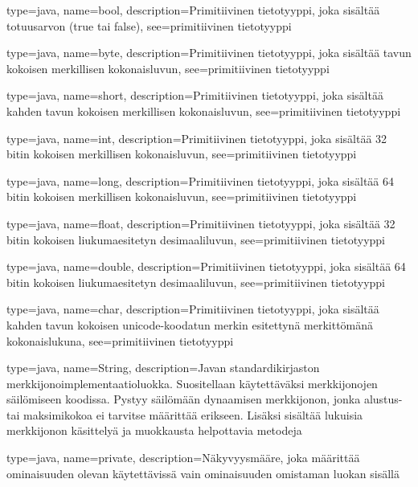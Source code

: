 {
    type=java,
    name=bool,
    description={Primitiivinen tietotyyppi, joka sisältää totuusarvon (true tai false)},
    see={primitiivinen tietotyyppi}
}

{
    type=java,
    name=byte,
    description={Primitiivinen tietotyyppi, joka sisältää tavun kokoisen merkillisen
kokonaisluvun},
    see={primitiivinen tietotyyppi}
}

{
    type=java,
    name=short,
    description={Primitiivinen tietotyyppi, joka sisältää kahden tavun kokoisen merkillisen
kokonaisluvun},
    see={primitiivinen tietotyyppi}
}

{
    type=java,
    name=int,
    description={Primitiivinen tietotyyppi, joka sisältää 32 bitin kokoisen merkillisen
kokonaisluvun},
    see={primitiivinen tietotyyppi}
}

{
    type=java,
    name=long,
    description={Primitiivinen tietotyyppi, joka sisältää 64 bitin kokoisen merkillisen
kokonaisluvun},
    see={primitiivinen tietotyyppi}
}

{
    type=java,
    name=float,
    description={Primitiivinen tietotyyppi, joka sisältää 32 bitin kokoisen liukumaesitetyn
desimaaliluvun},
    see={primitiivinen tietotyyppi}
}

{
    type=java,
    name=double,
    description={Primitiivinen tietotyyppi, joka sisältää 64 bitin kokoisen liukumaesitetyn
desimaaliluvun},
    see={primitiivinen tietotyyppi}
}

{
    type=java,
    name=char,
    description={Primitiivinen tietotyyppi, joka sisältää kahden tavun kokoisen unicode-koodatun
merkin esitettynä merkittömänä kokonaislukuna},
    see={primitiivinen tietotyyppi}
}

{
    type=java,
    name=String,
    description={Javan standardikirjaston merkkijonoimplementaatioluokka. Suositellaan
käytettäväksi merkkijonojen säilömiseen koodissa. Pystyy säilömään dynaamisen merkkijonon, jonka
alustus- tai maksimikokoa ei tarvitse määrittää erikseen. Lisäksi sisältää lukuisia merkkijonon
käsittelyä ja muokkausta helpottavia metodeja}
}

{
	type=java,
	name=private,
	description={Näkyvyysmääre, joka määrittää ominaisuuden olevan käytettävissä vain ominaisuuden
omistaman luokan sisällä}
}

